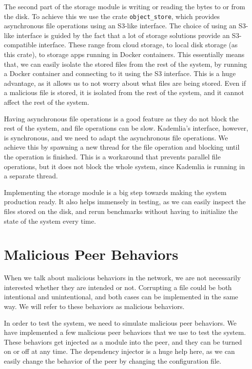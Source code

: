 The second part of the storage module is writing or reading the bytes to or from the disk.
To achieve this we use the crate \texttt{object\_store}, which provides
asynchronous file operations using an S3-like interface.
The choice of using an S3-like interface is guided by the fact that a lot of
storage solutions provide an S3-compatible interface.
These range from cloud storage, to local disk storage (as this crate), to storage apps
running in Docker containers.
This essentially means that, we can easily isolate the stored files from the rest of the system,
by running a Docker container and connecting to it using the S3 interface.
This is a huge advantage, as it allows us to not worry about what files are being stored.
Even if a malicious file is stored, it is isolated from the rest of the system,
and it cannot affect the rest of the system.

Having asynchronous file operations is a good feature as they do not block the rest of the system,
and file operations can be slow.
Kademlia's interface, however, is synchronous, and we need to adapt the asynchronous file operations.
We achieve this by spawning a new thread for the file operation and blocking
until the operation is finished.
This is a workaround that prevents parallel file operations,
but it does not block the whole system, since Kademlia is running in a separate thread.

Implementing the storage module is a big step towards making the system production ready.
It also helps immensely in testing, as we can easily inspect the files stored on the disk,
and rerun benchmarks without having to initialize the state of the system every time.

\section{Malicious Peer Behaviors}

When we talk about malicious behaviors in the network,
we are not necessarily interested whether they are intended or not.
Corrupting a file could be both intentional and unintentional,
and both cases can be implemented in the same way.
We will refer to these behaviors as malicious behaviors.

In order to test the system, we need to simulate malicious peer behaviors.
We have implemented a few malicious peer behaviors that we use to test the system.
These behaviors get injected as a module into the peer,
and they can be turned on or off at any time.
The dependency injector is a huge help here, as we can easily change the behavior of the peer
by changing the configuration file.

